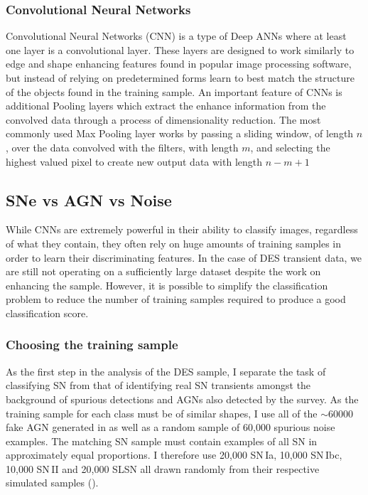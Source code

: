 \subsubsection{Convolutional Neural Networks}
Convolutional Neural Networks (CNN) is a type of Deep ANNs where at least one layer is a convolutional layer. These layers are designed to work similarly to edge and shape enhancing features found in popular image processing software, but instead of relying on predetermined forms learn to best match the structure of the objects found in the training sample. An important feature of CNNs is additional Pooling layers which extract the enhance information from the convolved data through a process of dimensionality reduction. The most commonly used Max Pooling layer works by passing a sliding window, of length $n$, over the data convolved with the filters, with length $m$, and selecting the highest valued pixel to create new output data with length $n-m+1$

\subsection{SNe vs AGN vs Noise}
While CNNs are extremely powerful in their ability to classify images, regardless of what they contain, they often rely on huge amounts of training samples in order to learn their discriminating features. In the case of DES transient data, we are still not operating on a sufficiently large dataset despite the work on enhancing the sample. However, it is possible to simplify the classification problem to reduce the number of training samples required to produce a good classification score.

\subsubsection{Choosing the training sample} \label{sec:AGNNoiseSNSample}
As the first step in the analysis of the DES sample, I separate the task of classifying SN from that of identifying real SN transients amongst the background of spurious detections and AGNs also detected by the survey. As the training sample for each class must be of similar shapes, I use all of the $\sim60000$ fake AGN generated in  as well as a random sample of 60,000 spurious noise examples. The matching SN sample must contain examples of all SN in approximately equal proportions. I therefore use 20,000 SN\,Ia, 10,000 SN\,Ibc, 10,000 SN\,II and 20,000 SLSN all drawn randomly from their respective simulated samples ().


